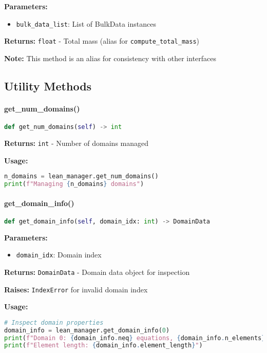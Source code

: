 \textbf{Parameters:}
\begin{itemize}
    \item \texttt{bulk\_data\_list}: List of BulkData instances
\end{itemize}

\textbf{Returns:} \texttt{float} - Total mass (alias for \texttt{compute\_total\_mass})

\textbf{Note:} This method is an alias for consistency with other interfaces

\subsection{Utility Methods}
\label{subsec:utility_methods}

\paragraph{get\_num\_domains()}\leavevmode
\begin{lstlisting}[language=Python, caption=Get Number of Domains Method]
def get_num_domains(self) -> int
\end{lstlisting}

\textbf{Returns:} \texttt{int} - Number of domains managed

\textbf{Usage:}
\begin{lstlisting}[language=Python, caption=Get Domains Count Usage]
n_domains = lean_manager.get_num_domains()
print(f"Managing {n_domains} domains")
\end{lstlisting}

\paragraph{get\_domain\_info()}\leavevmode
\begin{lstlisting}[language=Python, caption=Get Domain Info Method]
def get_domain_info(self, domain_idx: int) -> DomainData
\end{lstlisting}

\textbf{Parameters:}
\begin{itemize}
    \item \texttt{domain\_idx}: Domain index
\end{itemize}

\textbf{Returns:} \texttt{DomainData} - Domain data object for inspection

\textbf{Raises:} \texttt{IndexError} for invalid domain index

\textbf{Usage:}
\begin{lstlisting}[language=Python, caption=Domain Info Usage]
# Inspect domain properties
domain_info = lean_manager.get_domain_info(0)
print(f"Domain 0: {domain_info.neq} equations, {domain_info.n_elements} elements")
print(f"Element length: {domain_info.element_length}")
\end{lstlisting}

